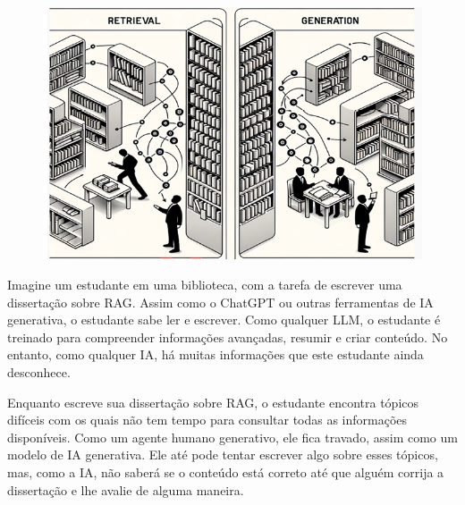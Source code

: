 \documentclass[a4paper, 12pt]{article}
\newcommand{\citeb}[1]{\bibleftbracket\cite{#1}\bibrightbracket}
\begin{document}
    \begin{figure}[ht]
        \includegraphics[width=\textwidth,height=0.9\textheight,keepaspectratio]{retrieval-generation-denis-rothman.png}
        \centering
        \centering
    \end{figure}

    Imagine um estudante em uma biblioteca, com a tarefa de escrever uma dissertação sobre RAG. Assim como o ChatGPT ou outras ferramentas de IA generativa, o estudante sabe ler e escrever. Como qualquer LLM, o estudante é treinado para compreender informações avançadas, resumir e criar conteúdo. No entanto, como qualquer IA, há muitas informações que este estudante ainda desconhece.


    Enquanto escreve sua dissertação sobre RAG, o estudante encontra tópicos difíceis com os quais não tem tempo para consultar todas as informações disponíveis. Como um agente humano generativo, ele fica travado, assim como um modelo de IA generativa. Ele até pode tentar escrever algo sobre esses tópicos, mas, como a IA, não saberá se o conteúdo está correto até que alguém corrija a dissertação e lhe avalie de alguma maneira.
\end{document}
